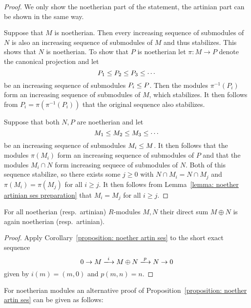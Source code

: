 \begin{proof}
  We only show the noetherian part of the statement, the artinian part can be shown in the same way.
  
  Suppose that $M$ is noetherian.
  Then every increasing sequence of submodules of $N$ is also an increasing sequence of submodules of $M$ and thus stabilizes.
  This shows that $N$ is noetherian.
  To show that $P$ is noetherian let $\pi \colon M \to P$ denote the canonical projection and let
  \[
                P_1
    \leq  P_2
    \leq  P_3
    \leq  \dotsb
  \]
  be an increasing sequence of submodules $P_i \leq P$.
  Then the modules $\pi^{-1}(P_i)$ form an increasing sequence of submodules of $M$, which stabilizes.
  It then follows from $P_i = \pi(\pi^{-1}(P_i))$ that the original sequence also stabilizes.
  
  Suppose that both $N, P$ are noetherian and let
  \[
                M_1
    \leq  M_2
    \leq  M_3
    \leq  \dotsb
  \]
  be an increasing sequence of submodules $M_i \leq M$.
  It then follows that the modules $\pi(M_i)$ form an increasing sequence of submodules of $P$ and that the modules $M_i \cap N$ form increasing sequece of submodules of $N$.
  Both of this sequence stabilize, so there exists some $j \geq 0$ with $N \cap M_i = N \cap M_j$ and $\pi(M_i) = \pi(M_j)$ for all $i \geq j$.
  It then follows from Lemma~\ref{lemma: noether artinian ses preparation} that $M_i = M_j$ for all $i \geq j$.
\end{proof}


\begin{corollary}
  \label{corollary: direct sum of noetherian artinian}
  For all noetherian (resp.\ artinian) $R$-modules $M, N$ their direct sum $M \oplus N$ is again noetherian (resp.\ artinian).
\end{corollary}


\begin{proof}
  Apply Corollary~\ref{proposition: noether artin ses} to the short exact sequence
  \[
                        0
    \to                 M
    \xlongrightarrow{i} M \oplus N
    \xlongrightarrow{p} N
    \to                 0
  \]
  given by $i(m) = (m,0)$ and $p(m,n) = n$.
\end{proof}


\begin{fluff}
  For noetherian modules an alternative proof of Proposition~\ref{proposition: noether artin ses} can be given as follows:
\end{fluff}


